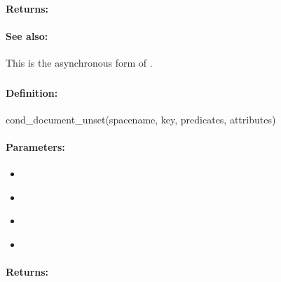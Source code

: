 \paragraph{Returns:}


\paragraph{See also:}  This is the asynchronous form of .

\pagebreak
\subsubsection{}
\label{api:ruby:cond_document_unset}


\paragraph{Definition:}
\begin{rubycode}
cond_document_unset(spacename, key, predicates, attributes)
\end{rubycode}

\paragraph{Parameters:}
\begin{itemize}[noitemsep]
\item {}\\

\item {}\\

\item {}\\

\item {}\\

\end{itemize}

\paragraph{Returns:}


